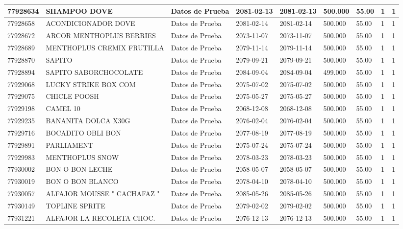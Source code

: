 \documentclass[a4paper,12pt]{article}
\begin{document}
\begin{landscape}
\begin{longtable}{|p{4cm}|p{2.5cm}|p{2.5cm}|p{1.8cm}|p{1.8cm}|p{1cm}|p{1cm}|p{3cm}|p{3cm}||}
77928634 & SHAMPOO DOVE & Datos de Prueba & 2081-02-13 & 2081-02-13 & 500.000 & 55.00 & 1 & 1 \\ \hline 
77928658 & ACONDICIONADOR DOVE & Datos de Prueba & 2081-02-14 & 2081-02-14 & 500.000 & 55.00 & 1 & 1 \\ \hline 
77928672 & ARCOR MENTHOPLUS BERRIES & Datos de Prueba & 2073-11-07 & 2073-11-07 & 500.000 & 55.00 & 1 & 1 \\ \hline 
77928689 & MENTHOPLUS CREMIX FRUTILLA & Datos de Prueba & 2079-11-14 & 2079-11-14 & 500.000 & 55.00 & 1 & 1 \\ \hline 
77928870 & SAPITO & Datos de Prueba & 2079-09-21 & 2079-09-21 & 500.000 & 55.00 & 1 & 1 \\ \hline 
77928894 & SAPITO SABORCHOCOLATE & Datos de Prueba & 2084-09-04 & 2084-09-04 & 499.000 & 55.00 & 1 & 1 \\ \hline 
77929068 & LUCKY STRIKE BOX COM & Datos de Prueba & 2075-07-02 & 2075-07-02 & 500.000 & 55.00 & 1 & 1 \\ \hline 
77929075 & CHICLE POOSH & Datos de Prueba & 2075-05-27 & 2075-05-27 & 500.000 & 55.00 & 1 & 1 \\ \hline 
77929198 & CAMEL 10 & Datos de Prueba & 2068-12-08 & 2068-12-08 & 500.000 & 55.00 & 1 & 1 \\ \hline 
77929235 & BANANITA DOLCA X30G & Datos de Prueba & 2076-02-04 & 2076-02-04 & 500.000 & 55.00 & 1 & 1 \\ \hline 
77929716 & BOCADITO OBLI BON & Datos de Prueba & 2077-08-19 & 2077-08-19 & 500.000 & 55.00 & 1 & 1 \\ \hline 
77929891 & PARLIAMENT & Datos de Prueba & 2075-07-24 & 2075-07-24 & 500.000 & 55.00 & 1 & 1 \\ \hline 
77929983 & MENTHOPLUS SNOW & Datos de Prueba & 2078-03-23 & 2078-03-23 & 500.000 & 55.00 & 1 & 1 \\ \hline 
77930002 & BON O BON LECHE & Datos de Prueba & 2058-05-07 & 2058-05-07 & 500.000 & 55.00 & 1 & 1 \\ \hline 
77930019 & BON O BON BLANCO & Datos de Prueba & 2078-04-10 & 2078-04-10 & 500.000 & 55.00 & 1 & 1 \\ \hline 
77930057 & ALFAJOR  MOUSSE " CACHAFAZ " & Datos de Prueba & 2085-05-26 & 2085-05-26 & 500.000 & 55.00 & 1 & 1 \\ \hline 
77930149 & TOPLINE SPRITE & Datos de Prueba & 2079-02-02 & 2079-02-02 & 500.000 & 55.00 & 1 & 1 \\ \hline 
77931221 & ALFAJOR LA RECOLETA CHOC. & Datos de Prueba & 2076-12-13 & 2076-12-13 & 500.000 & 55.00 & 1 & 1 \\ \hline 

\end{longtable}
\end{landscape}
\end{document}
